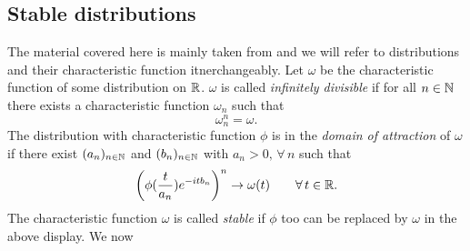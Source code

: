 

\subsection{Stable distributions}
The material covered here is mainly taken from \cite[Section 17]{feller1957introduction} and we will refer to distributions and their characteristic function itnerchangeably. Let $\omega$ be the characteristic function of some distribution on $\mathbb{R}$. $\omega$ is called \textit{infinitely divisible} if for all $n \in \mathbb{N}$ there exists a characteristic function $\omega_n$ such that 
\begin{equation}\nonumber
\omega_n^n = \omega. 
\end{equation}
The distribution with characteristic function $\phi$ is in the \textit{domain of attraction} of $\omega$ if there exist $(a_n)_{n \in \mathbb{N}}$ and $(b_n)_{n \in \mathbb{N}}$ with $a_n > 0,\,\forall\,n$ such that 
\begin{equation}\nonumber
\left(\phi(\frac{t}{a_n})e^{-itb_n}\right)^n \to \omega(t)\qquad\forall\,t \in \mathbb{R}. 
\end{equation}
The characteristic function $\omega$ is called \textit{stable} if $\phi$ too can be replaced by $\omega$ in the above display. We now 






\newpage